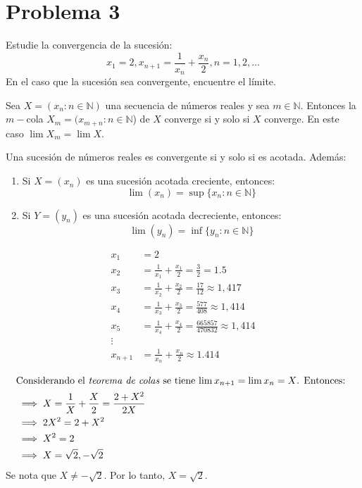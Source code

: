 \documentclass[a4paper,12pt]{article}
\begin{document}
\section{Problema 3} Estudie la convergencia de la sucesión:
$$
x_{1}=2, x_{n+1}=\frac{1}{x_{n}}+\frac{x_{n}}{2}, n=1,2, \ldots
$$
En el caso que la sucesión sea convergente, encuentre el límite.
\begin{tcolorbox}[colback=gray!15,colframe=gray!1!gray,title=Teorema de colas]
Sea $X=(x_n: n\in\mathbb{N})$ una secuencia de números reales y sea $m\in\mathbb{N}$. Entonces la $m-$cola $X_m=(x_{m+n}:n\in\mathbb{N}$) de $X$ converge si y solo si $X$ converge. En este caso $\lim X_m=\lim X$.
\end{tcolorbox}
\begin{tcolorbox}[colback=gray!15,colframe=gray!1!gray,title=Teorema Convergencia Monótona]
Una sucesión de números reales es convergente si y solo si es acotada. Además: 
\begin{enumerate}
    \item Si $X=(x_n)$ es una sucesión acotada creciente, entonces: 
$$\lim(x_n)=\sup\{x_n:n\in\mathbb{N}\}$$
\item Si $Y=(y_n)$ es una sucesión acotada decreciente, entonces: 
$$\lim(y_n)=\inf\{y_n:n\in\mathbb{N}\}$$
\end{enumerate}
\end{tcolorbox}
\begin{tcolorbox}[colback=gray!15,colframe=black!1!black,title=Convergencia numérica]
\begin{align}
    x_1&=2\\
x_{2}&=\frac{1}{x_1}+\frac{x_1}{2}=\frac{3}{2}= 1.5\\
x_{3}&=\frac{1}{x_2}+\frac{x_2}{2}=\frac{17}{12}\approx 1,417\\
x_{4}&=\frac{1}{x_3}+\frac{x_3}{2}=\frac{577}{408}\approx1,414\\
x_{5}&=\frac{1}{x_4}+\frac{x_4}{2}=\frac{665857}{470832}\approx1,414\\
\vdots\\
x_{n+1}&= \frac{1}{x_n}+\frac{x_n}{2}\approx 1.414
\end{align}
\end{tcolorbox}
\begin{tcolorbox}[colback=gray!15,colframe=black!1!black,title=Puntos fijos]
\begin{align}
\intertext{Considerando el \textit{teorema de colas} se tiene $\lim x_{n+1}=\lim x_{n}=X$. Entonces: }
&\implies X = \frac{1}{X}+\frac{X}{2}=\frac{2+X^2}{2X}\\
&\implies 2X^2 =2+X^2\\
&\implies X^2=2\\
&\implies X=\sqrt{2}, -\sqrt{2}
\end{align}
Se nota que $X\neq -\sqrt{2}$. Por lo tanto, $X=\sqrt{2}$.
\end{tcolorbox}
\end{document}
